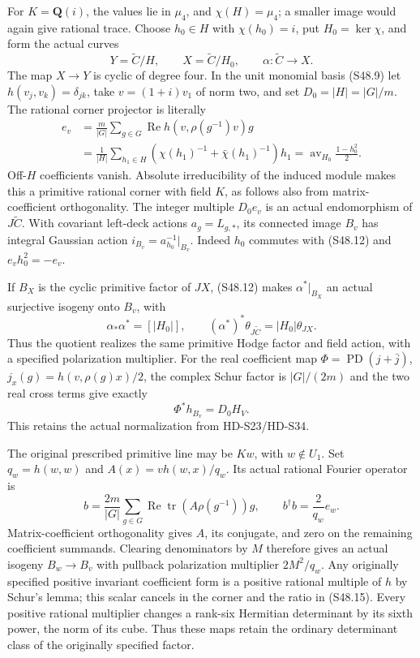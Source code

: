 For \(K=\mathbf Q(i)\), the values lie in \(\mu_4\),
and \(\chi(H)=\mu_4\); a smaller image would again give
rational trace. Choose \(h_0\in H\) with \(\chi(h_0)=i\),
put \(H_0=\ker\chi\), and form the actual curves
\[
  Y=\widetilde C/H,\qquad X=\widetilde C/H_0,
       \qquad\alpha:\widetilde C\longrightarrow X.
 \tag{S48.11}
\]
The map \(X\to Y\) is cyclic of degree four. In the
unit monomial basis (S48.9) let \(h(v_j,v_k)=\delta_{jk}\),
take \(v=(1+i)v_1\) of norm two, and set \(D_0=|H|=|G|/m\).
The rational corner projector is literally
\[
 \begin{aligned}
 e_v&=\frac m{|G|}\sum_{g\in G}
       \operatorname{Re}h(v,\rho(g^{-1})v)g\\
    &=\frac1{|H|}\sum_{h_1\in H}
           (\chi(h_1)^{-1}+\bar\chi(h_1)^{-1})h_1
      =\operatorname{av}_{H_0}\frac{1-h_0^2}{2}.
 \end{aligned}
 \tag{S48.12}
\]
Off-\(H\) coefficients vanish. Absolute irreducibility of
the induced module makes this a primitive rational corner with
field \(K\), as follows also from matrix-coefficient
orthogonality. The integer multiple \(D_0e_v\) is an actual
endomorphism of \(J\widetilde C\). With covariant left-deck
actions \(a_g=L_{g,*}\), its connected image \(B_v\)
has integral Gaussian action \(i_{B_v}=a_{h_0}^{-1}|_{B_v}\).
Indeed \(h_0\) commutes with (S48.12) and
\(e_vh_0^2=-e_v\).

If \(B_X\) is the cyclic primitive factor of \(JX\),
(S48.12) makes \(\alpha^*|_{B_X}\) an actual surjective
isogeny onto \(B_v\), with
\[
 \alpha_*\alpha^*=[|H_0|],\qquad
       (\alpha^*)^*\theta_{J\widetilde C}=|H_0|\theta_{JX}.
 \tag{S48.13}
\]
Thus the quotient realizes the same primitive Hodge factor and
field action, with a specified polarization multiplier.
For the real coefficient map
\(\Phi=\operatorname{PD}(j+\bar j)\),
\(j_x(g)=h(v,\rho(g)x)/2\), the complex Schur factor is
\(|G|/(2m)\) and the two real cross terms give exactly
\[
                         \Phi^*h_{B_v}=D_0 H_V.
 \tag{S48.14}
\]
This retains the actual normalization from HD-S23/HD-S34.

The original prescribed primitive line may be \(Kw\),
with \(w\notin U_1\). Set \(q_w=h(w,w)\) and
\(A(x)=v h(w,x)/q_w\). Its actual rational Fourier operator
is
\[
 b=\frac{2m}{|G|}\sum_{g\in G}
           \operatorname{Re}\operatorname{tr}
                       (A\rho(g^{-1}))g,
       \qquad b^\dagger b=\frac2{q_w}e_w.
 \tag{S48.15}
\]
Matrix-coefficient orthogonality gives \(A\), its conjugate,
and zero on the remaining coefficient summands. Clearing
denominators by \(M\) therefore gives an actual isogeny
\(B_w\to B_v\) with pullback polarization multiplier
\(2M^2/q_w\). Any originally specified positive invariant
coefficient form is a positive rational multiple of \(h\)
by Schur's lemma; this scalar cancels in the corner and the
ratio in (S48.15). Every positive rational multiplier changes
a rank-six Hermitian determinant by its sixth power, the norm
of its cube. Thus these maps retain the ordinary determinant
class of the originally specified factor.

